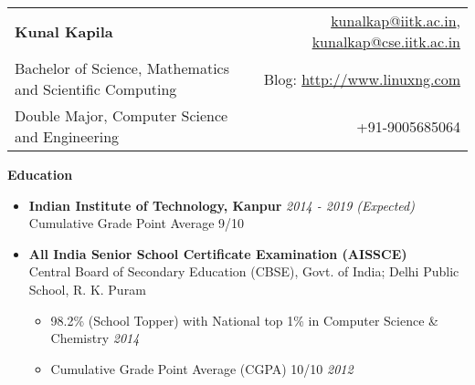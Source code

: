 \documentclass[letterpaper,11pt]{article}
\begin{document}
{\selectfont
\begin{tabular*}{7.5in}{l@{\extracolsep{\fill}}r}
    \textbf{\Large Kunal Kapila} & \href{mailto:kunalkap@iitk.ac.in}{kunalkap@iitk.ac.in},
        \href{mailto:kunalkap@cse.iitk.ac.in}{kunalkap@cse.iitk.ac.in}\\
    Bachelor of Science, Mathematics and Scientific Computing & Blog: \href{http://www.linuxng.com}{http://www.linuxng.com}\\
    Double Major, Computer Science and Engineering & +91-9005685064\\
    \hline
\end{tabular*}
\vspace{5pt}

\Large{\textbf{Education}}
\small
\begin{itemize}
    \item
        \textbf{Indian Institute of Technology, Kanpur} \hfill \textit{2014 - 2019 (Expected)}\\
        Cumulative Grade Point Average 9/10\\
    \item
        \textbf{All India Senior School Certificate Examination (AISSCE)}\\
        Central Board of Secondary Education (CBSE), Govt. of India; Delhi Public School, R. K. Puram\\
        \vspace{-2pt}
        \begin{itemize}
            \item 98.2\% (School Topper) with National top 1\% in Computer Science \& Chemistry \hfill \textit{2014}\\
            \item Cumulative Grade Point Average (CGPA) 10/10 \hfill\textit{2012}\\
        \end{itemize}
\end{itemize}

}
\end{document}

